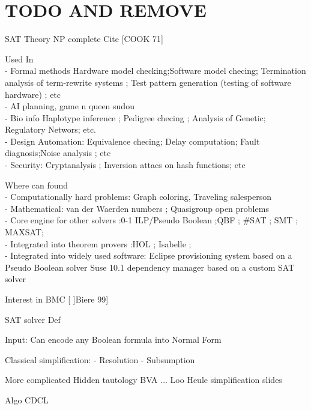 
\chapter{TODO AND REMOVE}



SAT Theory NP complete Cite [COOK 71]

Used In\\
- Formal methods Hardware model checking;Software model checing;
Termination analysis of term-rewrite systems ; Test pattern generation 
(testing of software hardware) ; etc\\
- AI planning, game n queen sudou \\
- Bio info Haplotype inference ; Pedigree checing ; Analysis of Genetic; Regulatory Networs; etc.\\
- Design Automation: Equivalence checing; Delay computation; Fault diagnosis;Noise analysis ; etc\\
- Security: Cryptanalysis ; Inversion attacs on hash functions; etc


Where can found \\
- Computationally hard problems: Graph coloring, Traveling salesperson\\
- Mathematical: van der Waerden numbers ; Quasigroup open problems  \\
- Core engine for other solvers :0-1 ILP/Pseudo Boolean ;QBF ; \#SAT ; SMT ; MAXSAT;\\ 
- Integrated into theorem provers :HOL ; Isabelle ;\\

- Integrated into widely used software: Eclipse provisioning system based on a Pseudo Boolean solver
Suse 10.1 dependency manager based on a custom SAT solver

Interest in BMC [ ]Biere 99]


SAT solver Def


Input: Can encode any Boolean formula into Normal Form

Classical simplification:
- Resolution
- Subsumption

More complicated
Hidden tautology
BVA
...
Loo Heule simplification slides


Algo CDCL

